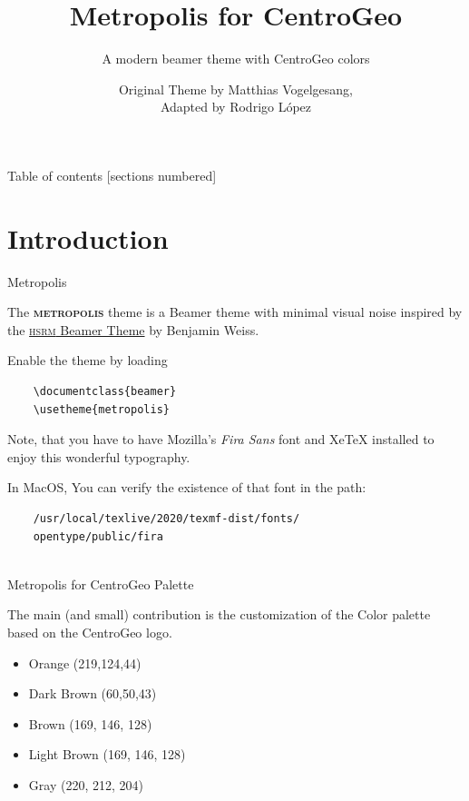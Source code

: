 \documentclass[10pt]{beamer}
\title{Metropolis for CentroGeo}
\subtitle{A modern beamer theme with CentroGeo colors}
\date{}
\author{Original Theme by Matthias Vogelgesang, \\ Adapted by Rodrigo López}
\institute{Centro de Investigación en
Ciencias de Información Geoespacial}
\newcommand{\themename}{\textbf{\textsc{metropolis}}\xspace}
\begin{document}
\maketitle

\begin{frame}{Table of contents}
  [sections numbered]
  \tableofcontents%
\end{frame}



\section[Intro]{Introduction}

\begin{frame}[fragile]{Metropolis}

  The \themename theme is a Beamer theme with minimal visual noise
  inspired by the \href{https://github.com/hsrmbeamertheme/hsrmbeamertheme}{\textsc{hsrm} Beamer
  Theme} by Benjamin Weiss.

  Enable the theme by loading

  \begin{verbatim}    \documentclass{beamer}
    \usetheme{metropolis}\end{verbatim}

  Note, that you have to have Mozilla's \emph{Fira Sans} font and XeTeX
  installed to enjoy this wonderful typography.
  
  In MacOS, You can verify the existence of that font in the path:
    \footnotesize{
    \begin{verbatim}    
    /usr/local/texlive/2020/texmf-dist/fonts/
    opentype/public/fira
    
    \end{verbatim}
    }
  
\end{frame}


\begin{frame}[fragile]{Metropolis for CentroGeo Palette}

The main (and small) contribution is the customization of the Color palette based on the CentroGeo logo.

	\begin{itemize}
		\item \textcolor{orange@centrogeo}{Orange (219,124,44) }
		\item \textcolor{darkbrown@centrogeo}{Dark Brown (60,50,43) }
		\item \textcolor{brown@centrogeo}{Brown (169, 146, 128) }
		\item \textcolor{lightbrown@centrogeo}{Light Brown (169, 146, 128) }
		\item \textcolor{gray@centrogeo}{Gray (220, 212, 204) }
	\end{itemize}
\end{frame}
\end{document}
